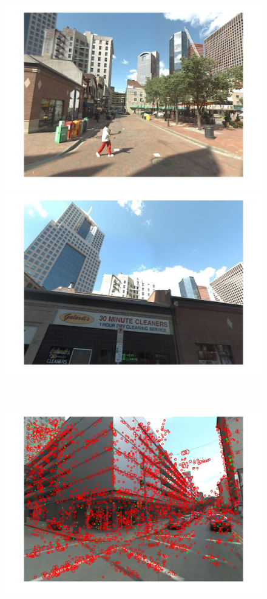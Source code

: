\begin{figure}[]
\begin{minipage}{0.48\linewidth}
\begin{minipage}{\wii}
            \includegraphics[width=\linewidth]{imgs/wVS3q/2932/b.jpg}
          \end{minipage}  
          \begin{minipage}{\wii}
            \centering
            \includegraphics[width=\linewidth]{imgs/wVS3q/2932/c.jpg}
          \end{minipage} 
          \\
          \begin{minipage}{\wii}
            \centering
            \includegraphics[width=\linewidth]{imgs/wVS3q/2932/aftrs.jpg}

\end{minipage}
\end{minipage}
\end{figure}
